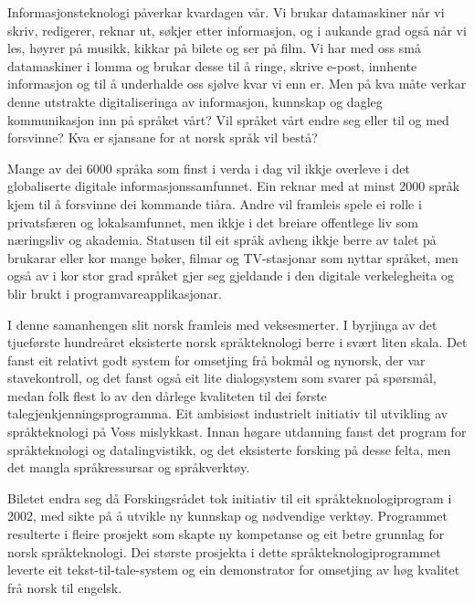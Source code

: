 \begin{multicols}{2}

Informasjonsteknologi påverkar kvardagen vår. Vi brukar datamaskiner når vi skriv, redigerer, reknar ut, søkjer etter informasjon, og i aukande grad også når vi les, høyrer på musikk, kikkar på bilete og ser på film. Vi har med oss små datamaskiner i lomma og brukar desse til å ringe, skrive e-post, innhente informasjon og til å underhalde oss sjølve kvar vi enn er. Men på kva måte verkar denne utstrakte digitaliseringa av informasjon, kunnskap og dagleg kommunikasjon inn på språket vårt? Vil språket vårt endre seg eller til og med forsvinne? Kva er sjansane for at norsk språk vil bestå?        

Mange av dei 6000 språka som finst i verda i dag vil ikkje overleve i det globaliserte digitale informasjonssamfunnet. Ein reknar med at minst 2000 språk kjem til å forsvinne dei kommande tiåra.  Andre vil framleis spele ei rolle i privatsfæren og lokalsamfunnet, men ikkje i det breiare offentlege liv som næringsliv og akademia. Statusen til eit språk avheng ikkje berre av talet på brukarar eller kor mange bøker, filmar og TV-stasjonar som nyttar språket, men også av i kor stor grad språket gjer seg gjeldande i den digitale verkelegheita og blir brukt i programvareapplikasjonar. 

I denne samanhengen slit norsk framleis med veksesmerter. I byrjinga av det tjueførste hundreåret eksisterte norsk språkteknologi berre i svært liten skala. Det fanst eit relativt godt system for omsetjing frå bokmål og nynorsk, der var stavekontroll, og det fanst også eit lite dialogsystem som svarer på spørsmål, medan folk flest lo av den dårlege kvaliteten til dei første talegjenkjenningsprogramma. Eit ambisiøst industrielt initiativ til utvikling av språkteknologi på Voss mislykkast. Innan høgare utdanning fanst det program for språkteknologi og datalingvistikk, og det eksisterte forsking på desse felta, men det mangla språkressursar og språkverktøy.            

Biletet endra seg då Forskingsrådet tok initiativ til eit språkteknologiprogram i 2002, med sikte på å utvikle ny kunnskap og nødvendige verktøy. Programmet resulterte i fleire prosjekt som skapte ny kompetanse og eit betre grunnlag for norsk språkteknologi. Dei største prosjekta i dette språkteknologiprogrammet leverte eit tekst-til-tale-system og ein demonstrator for omsetjing av høg kvalitet frå norsk til engelsk.


\end{multicols}
